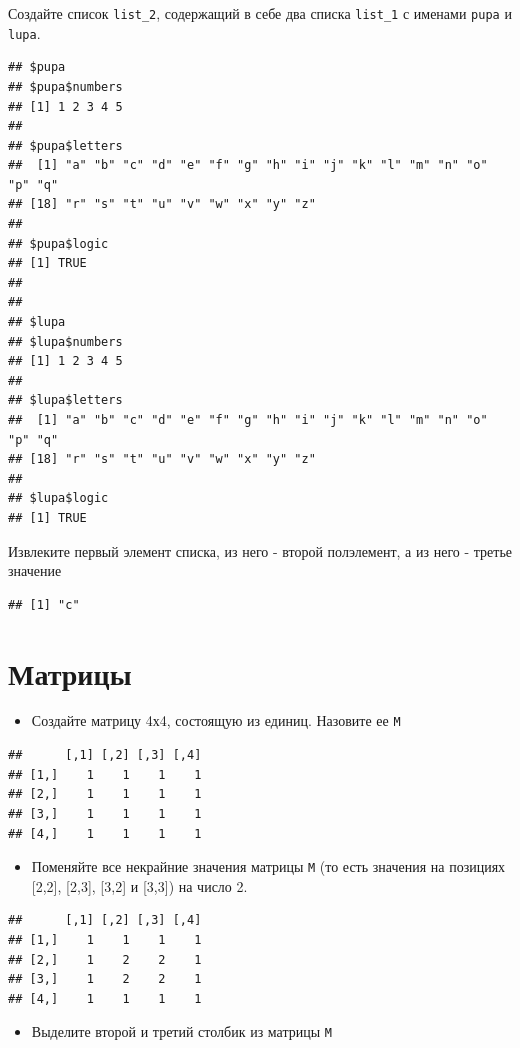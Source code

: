 \documentclass[]{book}
\providecommand{\tightlist}{%
  \setlength{\itemsep}{0pt}\setlength{\parskip}{0pt}}
\begin{document}
Создайте список \texttt{list\_2}, содержащий в себе два списка \texttt{list\_1} с именами \texttt{pupa} и \texttt{lupa}.

\begin{verbatim}
## $pupa
## $pupa$numbers
## [1] 1 2 3 4 5
## 
## $pupa$letters
##  [1] "a" "b" "c" "d" "e" "f" "g" "h" "i" "j" "k" "l" "m" "n" "o" "p" "q"
## [18] "r" "s" "t" "u" "v" "w" "x" "y" "z"
## 
## $pupa$logic
## [1] TRUE
## 
## 
## $lupa
## $lupa$numbers
## [1] 1 2 3 4 5
## 
## $lupa$letters
##  [1] "a" "b" "c" "d" "e" "f" "g" "h" "i" "j" "k" "l" "m" "n" "o" "p" "q"
## [18] "r" "s" "t" "u" "v" "w" "x" "y" "z"
## 
## $lupa$logic
## [1] TRUE
\end{verbatim}

Извлеките первый элемент списка, из него - второй полэлемент, а из него - третье значение

\begin{verbatim}
## [1] "c"
\end{verbatim}

\hypertarget{t}{%
\section{Матрицы}\label{t}}

\begin{itemize}
\tightlist
\item
  Создайте матрицу 4х4, состоящую из единиц. Назовите ее \texttt{M}
\end{itemize}

\begin{verbatim}
##      [,1] [,2] [,3] [,4]
## [1,]    1    1    1    1
## [2,]    1    1    1    1
## [3,]    1    1    1    1
## [4,]    1    1    1    1
\end{verbatim}

\begin{itemize}
\tightlist
\item
  Поменяйте все некрайние значения матрицы \texttt{M} (то есть значения на позициях {[}2,2{]}, {[}2,3{]}, {[}3,2{]} и {[}3,3{]}) на число 2.
\end{itemize}

\begin{verbatim}
##      [,1] [,2] [,3] [,4]
## [1,]    1    1    1    1
## [2,]    1    2    2    1
## [3,]    1    2    2    1
## [4,]    1    1    1    1
\end{verbatim}

\begin{itemize}
\tightlist
\item
  Выделите второй и третий столбик из матрицы \texttt{M}
\end{itemize}
\end{document}
